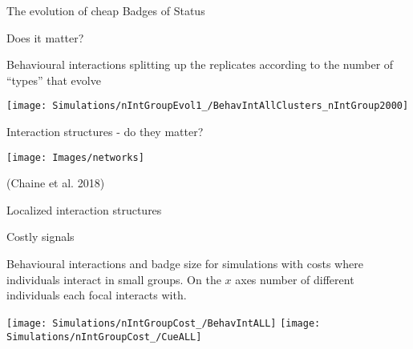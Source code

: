 \documentclass[
  ignorenonframetext,
]{beamer}
\begin{document}
\begin{frame}{The evolution of cheap Badges of Status}
\protect\hypertarget{the-evolution-of-cheap-badges-of-status-4}{}

\begin{block}{Does it matter?}

\small

Behavioural interactions splitting up the replicates according to the
number of ``types'' that evolve

\begin{flushleft}\texttt{[image: Simulations/nIntGroupEvol1\_/BehavIntAllClusters\_nIntGroup2000]} \end{flushleft}

\end{block}

\end{frame}

\begin{frame}{Interaction structures - do they matter?}
\protect\hypertarget{interaction-structures---do-they-matter}{}

\begin{center}\texttt{[image: Images/networks]} \end{center}

(Chaine et al. 2018)

\end{frame}

\begin{frame}{Localized interaction structures}
\protect\hypertarget{localized-interaction-structures}{}

\begin{block}{Costly signals}

\tiny

Behavioural interactions and badge size for simulations with costs where
individuals interact in small groups. On the \(x\) axes number of
different individuals each focal interacts with.

\begin{center}\texttt{[image: Simulations/nIntGroupCost\_/BehavIntALL]} \texttt{[image: Simulations/nIntGroupCost\_/CueALL]} \end{center}

\end{block}

\end{frame}
\end{document}
